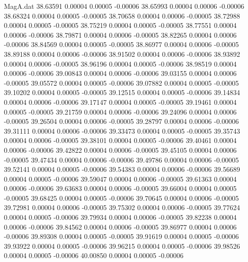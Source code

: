 \begin{filecontents}{MagA.dat}
  38.63591    0.00004    0.00005   -0.00006
  38.65993    0.00004    0.00006   -0.00006
  38.68324    0.00004    0.00005   -0.00005
  38.70658    0.00004    0.00006   -0.00005
  38.72988    0.00004    0.00005   -0.00005
  38.75219    0.00004    0.00005   -0.00005
  38.77551    0.00004    0.00006   -0.00006
  38.79871    0.00004    0.00006   -0.00005
  38.82265    0.00004    0.00006   -0.00006
  38.84569    0.00004    0.00005   -0.00005
  38.86977    0.00004    0.00006   -0.00005
  38.89188    0.00004    0.00006   -0.00006
  38.91502    0.00004    0.00006   -0.00006
  38.93892    0.00004    0.00006   -0.00005
  38.96196    0.00004    0.00005   -0.00006
  38.98519    0.00004    0.00006   -0.00006
  39.00843    0.00004    0.00006   -0.00006
  39.03155    0.00004    0.00006   -0.00005
  39.05572    0.00004    0.00005   -0.00006
  39.07882    0.00004    0.00005   -0.00005
  39.10202    0.00004    0.00005   -0.00005
  39.12515    0.00004    0.00005   -0.00006
  39.14834    0.00004    0.00006   -0.00006
  39.17147    0.00004    0.00005   -0.00005
  39.19461    0.00004    0.00005   -0.00005
  39.21759    0.00004    0.00006   -0.00006
  39.24096    0.00004    0.00006   -0.00005
  39.26504    0.00004    0.00006   -0.00005
  39.28797    0.00004    0.00006   -0.00006
  39.31111    0.00004    0.00006   -0.00006
  39.33473    0.00004    0.00005   -0.00005
  39.35743    0.00004    0.00006   -0.00005
  39.38101    0.00004    0.00005   -0.00006
  39.40461    0.00004    0.00006   -0.00006
  39.42822    0.00004    0.00006   -0.00005
  39.45105    0.00004    0.00006   -0.00005
  39.47434    0.00004    0.00006   -0.00006
  39.49786    0.00004    0.00006   -0.00005
  39.52141    0.00004    0.00005   -0.00006
  39.54383    0.00004    0.00006   -0.00006
  39.56689    0.00004    0.00005   -0.00006
  39.59047    0.00004    0.00006   -0.00005
  39.61363    0.00004    0.00006   -0.00006
  39.63683    0.00004    0.00006   -0.00005
  39.66004    0.00004    0.00005   -0.00005
  39.68425    0.00004    0.00005   -0.00006
  39.70645    0.00004    0.00006   -0.00005
  39.72981    0.00004    0.00006   -0.00005
  39.75302    0.00004    0.00006   -0.00005
  39.77624    0.00004    0.00005   -0.00006
  39.79934    0.00004    0.00006   -0.00005
  39.82238    0.00004    0.00006   -0.00006
  39.84562    0.00004    0.00006   -0.00005
  39.86977    0.00004    0.00006   -0.00006
  39.89308    0.00004    0.00005   -0.00005
  39.91619    0.00004    0.00005   -0.00006
  39.93922    0.00004    0.00005   -0.00006
  39.96215    0.00004    0.00005   -0.00006
  39.98526    0.00004    0.00005   -0.00006
  40.00850    0.00004    0.00005   -0.00006

\end{filecontents}
